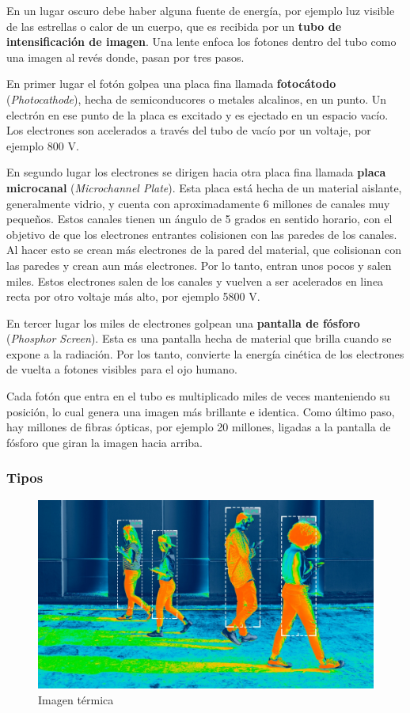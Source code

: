 En un lugar oscuro debe haber alguna fuente de energía, por ejemplo luz visible de las estrellas o calor de un cuerpo, que es recibida por un \textbf{tubo de intensificación de imagen}. Una lente enfoca los fotones dentro del tubo como una imagen al revés donde, pasan por tres pasos.

En primer lugar el fotón golpea una placa fina llamada \textbf{fotocátodo} (\textit{Photocathode}), hecha de semiconducores o metales alcalinos, en un punto. Un electrón en ese punto de la placa es excitado y es ejectado en un espacio vacío. Los electrones son acelerados a través del tubo de vacío por un voltaje, por ejemplo 800 V.

En segundo lugar los electrones se dirigen hacia otra placa fina llamada \textbf{placa microcanal} (\textit{Microchannel Plate}). Esta placa está hecha de un material aislante, generalmente vidrio, y cuenta con aproximadamente 6 millones de canales muy pequeños. Estos canales tienen un ángulo de 5 grados en sentido horario, con el objetivo de que los electrones entrantes colisionen con las paredes de los canales. Al hacer esto se crean más electrones de la pared del material, que colisionan con las paredes y crean aun más electrones. Por lo tanto, entran unos pocos y salen miles. Estos electrones salen de los canales y vuelven a ser acelerados en linea recta por otro voltaje más alto, por ejemplo 5800 V.

En tercer lugar los miles de electrones golpean una \textbf{pantalla de fósforo} (\textit{Phosphor Screen}). Esta es una pantalla hecha de material que brilla cuando se expone a la radiación. Por los tanto, convierte la energía cinética de los electrones de vuelta a fotones visibles para el ojo humano.

Cada fotón que entra en el tubo es multiplicado miles de veces manteniendo su posición, lo cual genera una imagen más brillante e identica. Como último paso, hay millones de fibras ópticas, por ejemplo 20 millones, ligadas a la pantalla de fósforo que giran la imagen hacia arriba\cite{ytvrtbv}.

\subsubsection{Tipos}

\begin{figure}[H]
  \centering
  \includegraphics[scale=0.3]{imagenes/imagen_termica.png}
  \caption{Imagen térmica\cite{bytronicti}}
\end{figure}

